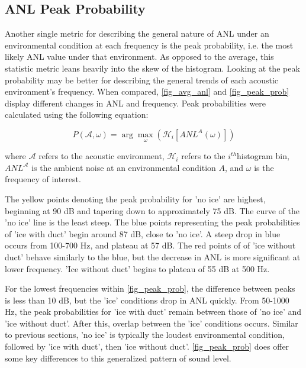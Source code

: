\subsection{ANL Peak Probability} \label{sec_peak_prob}

Another single metric for describing the general nature of ANL under an environmental condition at each frequency is the peak probability, i.e. the most likely ANL value under that environment. As opposed to the average, this statistic metric leans heavily into the skew of the histogram. Looking at the peak probability may be better for describing the general trends of each acoustic environment's frequency. When compared, \autoref{fig_avg_anl} and \autoref{fig_peak_prob} display different changes in ANL and frequency. Peak probabilities were calculated using the following equation:

\begin{equation}
P(\mathcal{A},\omega)= \arg \max_{\omega} (\mathcal{H}_{i} [ANL ^{A}(\omega)]) 	%
\end{equation}

where $\mathcal{A}$ refers to the acoustic environment, $\mathcal{H}_{i}$ refers to the $i^{th}$histogram bin, $ANL^{\mathcal{A}}$ is the ambient noise at an environmental condition $A$, and $\omega$ is the frequency of interest.


The yellow points denoting the peak probability for 'no ice' are highest, beginning at  90 dB and tapering down to approximately 75 dB. The curve of the 'no ice' line is the least steep. The blue points representing the peak probabilities of 'ice with duct' begin around 87 dB, close to 'no ice'. A steep drop in blue occurs from 100-700 Hz, and plateau at 57 dB. The red points of of 'ice without duct' behave similarly to the blue, but the decrease in ANL is more significant at lower frequency. 'Ice without duct' begins to plateau of 55 dB at 500 Hz.

For the lowest frequencies within \autoref{fig_peak_prob}, the difference between peaks is less than 10 dB, but the 'ice' conditions drop in ANL quickly. From 50-1000 Hz, the peak probabilities for 'ice with duct' remain between those of 'no ice' and 'ice without duct'. After this, overlap between the 'ice' conditions occurs. Similar to previous sections, 'no ice' is typically the loudest environmental condition, followed by 'ice with duct', then 'ice without duct'. \autoref{fig_peak_prob} does offer some key differences to this generalized pattern of sound level.

